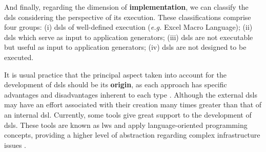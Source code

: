 And finally, regarding the dimension of \textbf{implementation}, we can classify the \acp{dsl} considering the perspective of its execution.
These classifications comprise four groups:
(i) \acp{dsl} of well-defined execution (\textit{e.g.} Excel Macro Language);
(ii) \acp{dsl} which serve as input to application generators;
(iii) \acp{dsl} are not executable but useful as input to application generators;
(iv) \acp{dsl} are not designed to be executed.



It is usual practice that the principal aspect taken into account for the development of \acp{dsl} should be its \textbf{origin}, as each approach has specific advantages and disadvantages inherent to each type \cite{Fowler:2010}.
Although the external \acp{dsl} may have an effort associated with their creation many times greater than that of an internal \ac{dsl}. 
Currently, some tools give great support to the development of \acp{dsl}.
These tools are known as \acp{lw} and apply language-oriented programming concepts, providing a higher level of abstraction regarding complex infrastructure issues \cite{Fowler:2005}.


